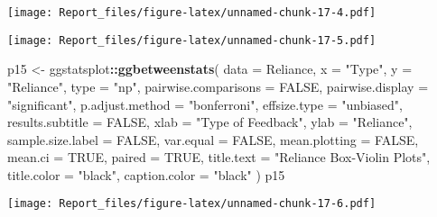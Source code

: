 \documentclass[
]{article}
\newenvironment{Shaded}{\begin{snugshade}}{\end{snugshade}}
\newcommand{\CommentTok}[1]{\textcolor[rgb]{0.56,0.35,0.01}{\textit{#1}}}
\newcommand{\DataTypeTok}[1]{\textcolor[rgb]{0.13,0.29,0.53}{#1}}
\newcommand{\KeywordTok}[1]{\textcolor[rgb]{0.13,0.29,0.53}{\textbf{#1}}}
\newcommand{\NormalTok}[1]{#1}
\newcommand{\OperatorTok}[1]{\textcolor[rgb]{0.81,0.36,0.00}{\textbf{#1}}}
\newcommand{\OtherTok}[1]{\textcolor[rgb]{0.56,0.35,0.01}{#1}}
\newcommand{\StringTok}[1]{\textcolor[rgb]{0.31,0.60,0.02}{#1}}
\begin{document}
\texttt{[image: Report\_files/figure-latex/unnamed-chunk-17-4.pdf]}

\begin{Shaded}
\end{Shaded}

\texttt{[image: Report\_files/figure-latex/unnamed-chunk-17-5.pdf]}

\begin{Shaded}
\begin{Highlighting}[]
\NormalTok{p15 <-}\StringTok{ }\NormalTok{ggstatsplot}\OperatorTok{::}\KeywordTok{ggbetweenstats}\NormalTok{(}
  \DataTypeTok{data =}\NormalTok{ Reliance,}
  \DataTypeTok{x =} \StringTok{"Type"}\NormalTok{,}
  \DataTypeTok{y =} \StringTok{"Reliance"}\NormalTok{,}
  \DataTypeTok{type =} \StringTok{"np"}\NormalTok{,}
  \DataTypeTok{pairwise.comparisons =} \OtherTok{FALSE}\NormalTok{,}
  \DataTypeTok{pairwise.display =} \StringTok{"significant"}\NormalTok{,}
  \DataTypeTok{p.adjust.method =} \StringTok{"bonferroni"}\NormalTok{,}
  \DataTypeTok{effsize.type =} \StringTok{"unbiased"}\NormalTok{,}
  \DataTypeTok{results.subtitle =} \OtherTok{FALSE}\NormalTok{,}
  \DataTypeTok{xlab =} \StringTok{"Type of Feedback"}\NormalTok{,}
  \DataTypeTok{ylab =} \StringTok{"Reliance"}\NormalTok{,}
  \DataTypeTok{sample.size.label =} \OtherTok{FALSE}\NormalTok{,}
  \DataTypeTok{var.equal =} \OtherTok{FALSE}\NormalTok{,}
  \DataTypeTok{mean.plotting =} \OtherTok{FALSE}\NormalTok{,}
  \DataTypeTok{mean.ci =} \OtherTok{TRUE}\NormalTok{,}
  \DataTypeTok{paired =} \OtherTok{TRUE}\NormalTok{,}
  \DataTypeTok{title.text =} \StringTok{"Reliance Box-Violin Plots"}\NormalTok{,}
  \DataTypeTok{title.color =} \StringTok{"black"}\NormalTok{,}
  \DataTypeTok{caption.color =} \StringTok{"black"}
\NormalTok{  )}
\NormalTok{p15}
\end{Highlighting}
\end{Shaded}

\texttt{[image: Report\_files/figure-latex/unnamed-chunk-17-6.pdf]}
\end{document}
